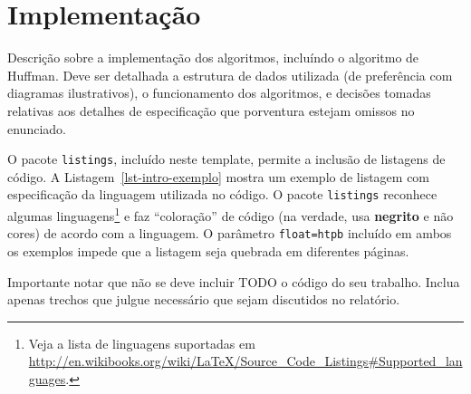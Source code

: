 \chapter{Implementação}
\label{sec-implementacao}


Descrição sobre a implementação dos algoritmos, incluíndo o algoritmo de Huffman. Deve ser detalhada a estrutura de dados utilizada (de preferência com diagramas ilustrativos), o funcionamento dos algoritmos, e decisões tomadas relativas aos detalhes de especificação que porventura estejam omissos no enunciado.


O pacote \texttt{listings}, incluído neste template, permite a inclusão de listagens de código.  A Listagem~\ref{lst-intro-exemplo} mostra um exemplo de listagem com especificação da linguagem utilizada no código. O pacote \texttt{listings} reconhece algumas linguagens\footnote{Veja a lista de linguagens suportadas em \url{http://en.wikibooks.org/wiki/LaTeX/Source\_Code\_Listings\#Supported_languages}.} e faz ``coloração'' de código (na verdade, usa \textbf{negrito} e não cores) de acordo com a linguagem. O parâmetro \texttt{float=htpb} incluído em ambos os exemplos impede que a listagem seja quebrada em diferentes páginas.

Importante notar que não se deve incluir TODO o código do seu trabalho. Inclua apenas trechos que julgue necessário que sejam discutidos no relatório.


% 
